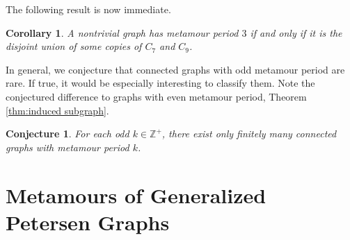 \documentclass[12pt]{amsart}
\newtheorem{corollary}[theorem]{Corollary}
\newtheorem{conjecture}[theorem]{Conjecture}
\theoremstyle{definition}
\theoremstyle{remark}
\numberwithin{equation}{section}
\numberwithin{figure}{section}
\newcommand{\Z}{\mathbb{Z}}
\begin{document}
The following result is now immediate.

\begin{corollary} \label{cor: classification period 3}
    A nontrivial graph has metamour period $3$ if and only if it is the disjoint union of some copies of $C_7$ and $C_9$.
\end{corollary}

In general, we conjecture that connected graphs with odd metamour period are rare. If true, it would be especially interesting to classify them. Note the conjectured difference to graphs with even metamour period, Theorem \ref{thm:induced subgraph}.

\begin{conjecture} \label{conj: odd periodic}
    For each odd $k\in \Z^+$, there exist only finitely many connected graphs with metamour period $k$.
\end{conjecture}

\section{Metamours of Generalized Petersen Graphs}
\end{document}
